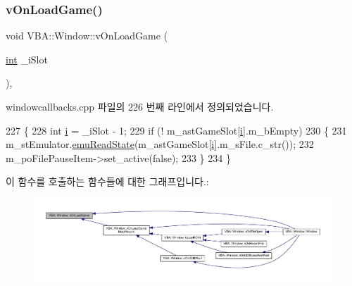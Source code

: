 \subsubsection{\texorpdfstring{v\+On\+Load\+Game()}{vOnLoadGame()}}
{\footnotesize\ttfamily void V\+B\+A\+::\+Window\+::v\+On\+Load\+Game (\begin{DoxyParamCaption}\item[{\mbox{\hyperlink{_util_8cpp_a0ef32aa8672df19503a49fab2d0c8071}{int}}}]{\+\_\+i\+Slot }\end{DoxyParamCaption})\hspace{0.3cm}{\ttfamily [protected]}, {\ttfamily [virtual]}}



windowcallbacks.\+cpp 파일의 226 번째 라인에서 정의되었습니다.


\begin{DoxyCode}
227 \{
228   \textcolor{keywordtype}{int} \mbox{\hyperlink{expr-lex_8cpp_acb559820d9ca11295b4500f179ef6392}{i}} = \_iSlot - 1;
229   \textcolor{keywordflow}{if} (! m\_astGameSlot[\mbox{\hyperlink{expr-lex_8cpp_acb559820d9ca11295b4500f179ef6392}{i}}].m\_bEmpty)
230   \{
231     m\_stEmulator.\mbox{\hyperlink{struct_emulated_system_a1ad8780083ad23c2cbe474fc570745ea}{emuReadState}}(m\_astGameSlot[\mbox{\hyperlink{expr-lex_8cpp_acb559820d9ca11295b4500f179ef6392}{i}}].m\_sFile.c\_str());
232     m\_poFilePauseItem->set\_active(\textcolor{keyword}{false});
233   \}
234 \}
\end{DoxyCode}
이 함수를 호출하는 함수들에 대한 그래프입니다.\+:
\nopagebreak
\begin{figure}[H]
\begin{center}
\leavevmode
\includegraphics[width=350pt]{class_v_b_a_1_1_window_a18461a94955930d3e10fdb093322d7a9_icgraph}
\end{center}
\end{figure}
\mbox{\label{class_v_b_a_1_1_window_a9457e3b8fe1022c96a548e1169002f0c}} 
